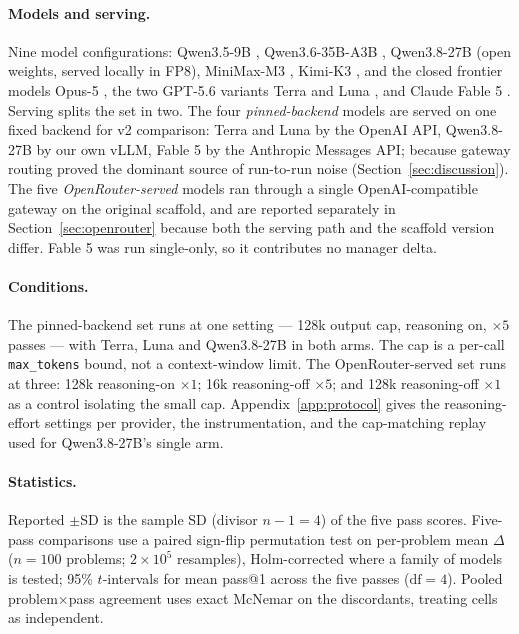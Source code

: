 \documentclass{article}
\begin{document}
\paragraph{Models and serving.} Nine model configurations: Qwen3.5-9B \citep{qwen2026a},
Qwen3.6-35B-A3B \citep{qwen2026b}, Qwen3.8-27B \citep{qwen2026c} (open weights, served
locally in FP8), MiniMax-M3 \citep{minimax2026}, Kimi-K3 \citep{moonshot2026}, and the closed
frontier models Opus-5 \citep{anthropic2026}, the two GPT-5.6 variants Terra and Luna
\citep{openai2026}, and Claude Fable 5 \citep{anthropic2026}. Serving splits the set in two.
The four \emph{pinned-backend} models are served on one fixed backend for v2 comparison: Terra and Luna by the OpenAI API, Qwen3.8-27B by our own vLLM, Fable 5 by the
Anthropic Messages API; because gateway routing proved the dominant source of run-to-run
noise (Section~\ref{sec:discussion}). The five \emph{OpenRouter-served} models ran through a
single OpenAI-compatible gateway on the original scaffold, and are reported separately in
Section~\ref{sec:openrouter} because both the serving path and the scaffold version differ.
Fable 5 was run single-only, so it contributes no manager delta.

\paragraph{Conditions.} The pinned-backend set runs at one setting --- 128k output cap,
reasoning on, $\times 5$ passes --- with Terra, Luna and Qwen3.8-27B in both arms. The cap is
a per-call \texttt{max\_tokens} bound, not a context-window limit. The OpenRouter-served set
runs at three: 128k reasoning-on $\times 1$; 16k reasoning-off $\times 5$; and 128k
reasoning-off $\times 1$ as a control isolating the small cap. Appendix~\ref{app:protocol}
gives the reasoning-effort settings per provider, the instrumentation, and the cap-matching
replay used for Qwen3.8-27B's single arm.

\paragraph{Statistics.} Reported $\pm$SD is the sample SD (divisor $n-1 = 4$) of the five
pass scores. Five-pass comparisons use a paired sign-flip permutation test on per-problem
mean $\Delta$ ($n = 100$ problems; $2\times10^{5}$ resamples), Holm-corrected where a family
of models is tested; 95\% $t$-intervals for mean pass@1 across the five passes
($\mathrm{df} = 4$). Pooled problem$\times$pass agreement uses exact McNemar on the
discordants, treating cells as independent.
\end{document}
